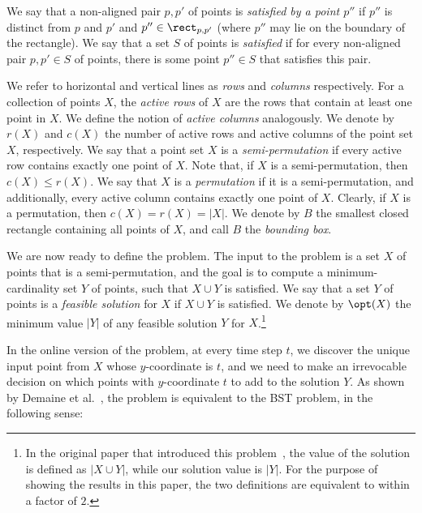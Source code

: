 \documentclass{toc}
\begin{document}
	\begin{definition}
	We say that a non-aligned pair $p,p'$ of points is \emph{satisfied by a point $p''$} if $p''$ is distinct from $p$ and $p'$ and $p''\in \rect_{p,p'}$ (where $p''$ may lie on the boundary of the rectangle).
	We say that a set $S$ of points is \emph{satisfied} if for every non-aligned pair $p,p'\in S$ of points, there is some point $p''\in S$ that satisfies this pair.
	\end{definition}

	We refer to horizontal and vertical lines as \emph{rows} and \emph{columns} respectively. 
	For a collection of points $X$, the \textit{active rows} of $X$ are the rows that contain at least one point in $X$. We define the notion of \textit{active columns} analogously. 
	We denote by $r(X)$ and $c(X)$ the number of active rows and active columns of the point set $X$, respectively.
	We say that a point set $X$ is a \emph{semi-permutation} if every active row contains exactly one point of $X$.
	Note that, if $X$ is a semi-permutation, then $c(X) \le r(X)$. We say that $X$ is a \emph{permutation} if it is a semi-permutation, and additionally, every active column contains exactly one point of $X$.  
	Clearly,  if $X$ is a permutation, then $c(X)=r(X)=|X|$. 
	We denote by  $B$ the smallest closed rectangle containing all points of $X$, and call $B$ the \emph{bounding box}.
%

	We are now ready to define the  \minsat problem. 
%
%
The input to the problem is a set $X$ of points that is a semi-permutation, and the goal is to compute a minimum-cardinality set $Y$ of points, such that $X\cup Y$ is satisfied.  
	We say that a set $Y$ of points is a \emph{feasible solution} for $X$ if $X\cup Y$ is satisfied. We denote by $\opt(X)$ the minimum value $|Y|$ of any feasible solution $Y$ for $X$.\footnote{In the original paper that introduced this problem~\cite{DHIKP09}, the value of the solution is defined as $|X \cup Y|$, while our solution value is $|Y|$. For the purpose of showing the results in this paper, the two definitions are equivalent to within a factor of $2$.}
	
%
%
%
%
%
%
In the online version of the \minsat problem, at every time step $t$, we discover the unique input point from $X$ whose $y$-coordinate is $t$, and we need to make an irrevocable decision on which points with $y$-coordinate $t$ to add to the solution $Y$.
%
%
As shown by Demaine et al.~\cite{DHIKP09},
the \minsat problem is equivalent to the BST problem, in the following sense:
%
\end{document}
